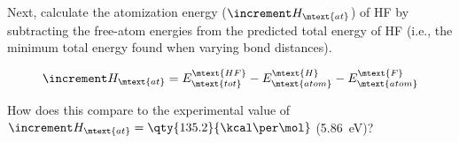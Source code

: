 \begin{enumerate}

Next, calculate the atomization energy (\( \increment H_\mtext{at} \)) of HF by subtracting the free-atom energies from the predicted total energy of HF (i.e., the minimum total energy found when varying bond distances).

\begin{equation}
 \increment H_\mtext{at}= E^\mtext{HF}_\mtext{tot} - E^\mtext{H}_\mtext{atom} - E^\mtext{F}_\mtext{atom}
\end{equation}

How does this compare to the experimental value of \(\increment H_\mtext{at}=\qty{135.2}{\kcal\per\mol}\) (\qty{5.86}{\eV})? 


\end{enumerate}
